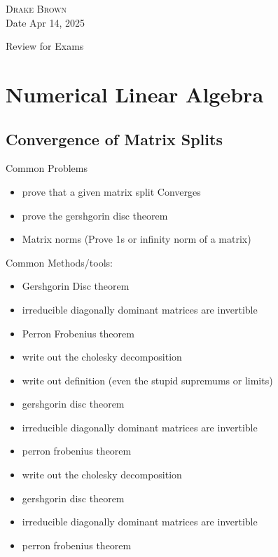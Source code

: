 \documentclass[12pt]{article}
\begin{document}
\DeclarePairedDelimiter\floor{\lfloor}{\rfloor}
\DeclarePairedDelimiter\ceil{\lceil}{\rceil}


\begin{flushright}
	\textsc{Drake Brown}  \\
	Date Apr 14, 2025
\end{flushright}
\begin{center}
	Review for Exams
\end{center}
\section{Numerical Linear Algebra }

\subsection{Convergence of Matrix Splits}
Common Problems
\begin{itemize}
	\item prove that a given matrix split Converges
	\item prove the gershgorin disc theorem
	\item Matrix norms (Prove 1s or infinity norm of a matrix)
\end{itemize}

Common Methods/tools:
\begin{itemize}
	\item Gershgorin Disc theorem
	\item irreducible diagonally dominant matrices are invertible
	\item Perron Frobenius theorem
	\item write out the cholesky decomposition
	\item write out definition (even the stupid supremums or limits)
	\item gershgorin disc theorem
	\item irreducible diagonally dominant matrices are invertible
	\item perron frobenius theorem
	\item write out the cholesky decomposition
	\item gershgorin disc theorem
	\item irreducible diagonally dominant matrices are invertible
	\item perron frobenius theorem
\end{itemize}
\end{document}
